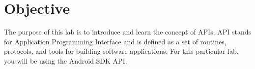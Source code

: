 \section{Objective}

The purpose of this lab is to introduce and learn the concept of APIs. API stands for Application Programming Interface and is defined as a set of routines, protocols, and tools for building software applications. For this particular lab, you will be using the Android SDK API.


